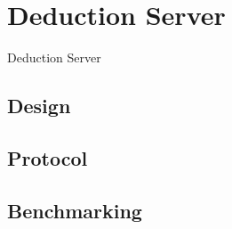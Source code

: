 \chapter{Deduction Server}
Deduction Server
  \section{Design}
  \section{Protocol}
  \section{Benchmarking}
